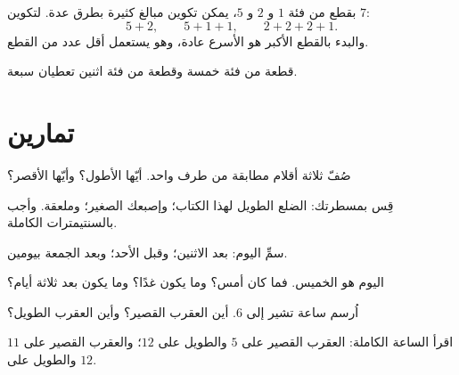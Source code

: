 \begin{example}\label{ex:g1:measure:coins}
بقطع من فئة $1$ و $2$ و $5$، يمكن تكوين مبالغ كثيرة بطرق عدة.
لتكوين $7$:
\[
5 + 2, \qquad
5 + 1 + 1, \qquad
2 + 2 + 2 + 1 .
\]
والبدء بالقطع الأكبر هو الأسرع عادة، وهو يستعمل أقل عدد من
القطع.
\end{example}

\begin{omfigure}

{\small قطعة من فئة خمسة وقطعة من فئة اثنين تعطيان سبعة.}
\end{omfigure}

\section{تمارين}

\begin{exercise}[$\star$]\label{exo:g1:measure:1}
صُفّ ثلاثة أقلام مطابقة من طرف واحد. أيّها الأطول؟ وأيّها
الأقصر؟
\end{exercise}

\begin{exercise}[$\star$]\label{exo:g1:measure:2}
قِس بمسطرتك: الضلع الطويل لهذا الكتاب؛ وإصبعك الصغير؛ وملعقة.
وأجب بالسنتيمترات الكاملة.
\end{exercise}

\begin{exercise}[$\star$]\label{exo:g1:measure:3}
سمِّ اليوم: بعد الاثنين؛ وقبل الأحد؛ وبعد الجمعة بيومين.
\end{exercise}

\begin{exercise}[$\star$]\label{exo:g1:measure:4}
اليوم هو الخميس. فما كان أمس؟ وما يكون غدًا؟ وما يكون بعد ثلاثة
أيام؟
\end{exercise}

\begin{exercise}[$\star$]\label{exo:g1:measure:5}
اُرسم ساعة تشير إلى $6$. أين العقرب القصير؟ وأين العقرب
الطويل؟
\end{exercise}

\begin{exercise}[$\star$]\label{exo:g1:measure:6}
اقرأ الساعة الكاملة: العقرب القصير على $5$ والطويل على $12$؛
والعقرب القصير على $11$ والطويل على $12$.
\end{exercise}

